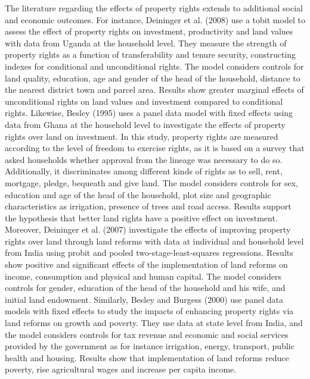 \documentclass[12pt,a4paper,english]{article}%
\begin{document}
The literature regarding the effects of property rights extends to additional social and economic outcomes. For instance, Deininger et al. (2008) use a tobit model to assess the effect of property rights on investment, productivity and land values with data from Uganda at the household level. They measure the strength of property rights as a function of transferability and tenure security, constructing indexes for conditional and unconditional rights. The model considers controls for land quality, education, age and gender of the head of the household, distance to the nearest district town and parcel area. Results show greater marginal effects of unconditional rights on land values and investment compared to conditional rights. Likewise, Besley (1995) uses a panel data model with fixed effects using data from Ghana at the household level to investigate the effects of property rights over land on investment. In this study, property rights are measured according to the level of freedom to exercise rights, as it is based on a survey that asked households whether approval from the lineage was necessary to do so. Additionally, it discriminates among different kinds of rights as to sell, rent, mortgage, pledge, bequeath and give land. The model considers controls for sex, education and age of the head of the household, plot size and geographic characteristics as irrigation, presence of trees and road access. Results support the hypothesis that better land rights have a positive effect on investment. Moreover, Deininger et al. (2007) investigate the effects of improving property rights over land through land reforms with data at individual and household level from India using probit and pooled two-stage-least-squares regressions. Results show positive and significant effects of the implementation of land reforms on income, consumption and physical and human capital. The model considers controls for gender, education of the head of the household and his wife, and initial land endowment. Similarly, Besley and Burgess (2000) use panel data models with fixed effects to study the impacts of enhancing property rights via land reforms on growth and poverty. They use data at state level from India, and the model considers controls for tax revenue and economic and social services provided by the government as for instance irrigation, energy, transport, public health and housing. Results show that implementation of land reforms reduce poverty, rise agricultural wages and increase per capita income.
\end{document}
